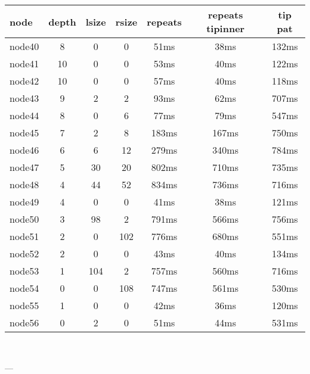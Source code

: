 \begin{tabular}{|l|c|c|c|c|c|c|}
\hline node & depth & lsize & rsize  & repeats & repeats tipinner & tip pat\\
    \hline node40 & 8 & 0 & 0 & 51ms & 38ms & 132ms\\
    \hline node41 & 10 & 0 & 0 & 53ms & 40ms & 122ms\\
    \hline node42 & 10 & 0 & 0 & 57ms & 40ms & 118ms\\
    \hline node43 & 9 & 2 & 2 & 93ms & 62ms & 707ms\\
    \hline node44 & 8 & 0 & 6 & 77ms & 79ms & 547ms\\
    \hline node45 & 7 & 2 & 8 & 183ms & 167ms & 750ms\\
    \hline node46 & 6 & 6 & 12 & 279ms & 340ms & 784ms\\
    \hline node47 & 5 & 30 & 20 & 802ms & 710ms & 735ms\\
    \hline node48 & 4 & 44 & 52 & 834ms & 736ms & 716ms\\
    \hline node49 & 4 & 0 & 0 & 41ms & 38ms & 121ms\\
    \hline node50 & 3 & 98 & 2 & 791ms & 566ms & 756ms\\
    \hline node51 & 2 & 0 & 102 & 776ms & 680ms & 551ms\\
    \hline node52 & 2 & 0 & 0 & 43ms & 40ms & 134ms\\
    \hline node53 & 1 & 104 & 2 & 757ms & 560ms & 716ms\\
    \hline node54 & 0 & 0 & 108 & 747ms & 561ms & 530ms\\
    \hline node55 & 1 & 0 & 0 & 42ms & 36ms & 120ms\\
    \hline node56 & 0 & 2 & 0 & 51ms & 44ms & 531ms\\

\hline
\end{tabular} \

---

